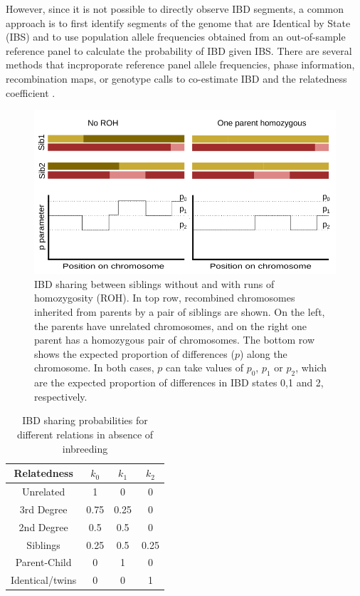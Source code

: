 \documentclass[12pt, letterpaper]{article}
\begin{document}
However, since it is not possible to directly observe IBD segments, a common approach is to first identify segments of the genome that are Identical by State (IBS) and to use population allele frequencies obtained from an out-of-sample reference panel to calculate the probability of IBD given IBS. There are several methods that incproporate reference panel allele frequencies, phase information, recombination maps, or genotype calls to co-estimate IBD and the relatedness coefficient \cite{huff_maximum-likelihood_2011,li_relationship_2014,li_accurate_2014,thornton_estimating_2012, boehnke_accurate_1997,lynch_estimation_1999, albrechtsen_natural_2010, purcell_plink_2007,manichaikul_robust_2010,gusev_whole_2009,nyerki_optimized_2022}.

\begin{figure}[h!]
    \includegraphics[width=18cm]{plots/inkscape_finalImg/schematic_sib.png}
    \centering
    \caption{IBD sharing between siblings without and with runs of homozygosity (ROH). In top row, recombined chromosomes inherited from parents by a pair of siblings are shown. On the left, the parents have unrelated chromosomes, and on the right one parent has a homozygous pair of chromosomes. The bottom row shows the expected proportion of differences ($p$) along the chromosome. In both cases, $p$ can take values of $p_0$, $p_1$ or $p_2$, which are the expected proportion of differences in IBD states 0,1 and 2, respectively.  }
    \label{fig0:schematic}
\end{figure}


\begin{table}[h!]
\caption{\label{tab:Table 1}IBD sharing probabilities for different relations in absence of inbreeding}
\begin{tabular}{|c|c|c|c|}
    \hline
    Relatedness & $k_0$ & $k_1$ & $k_2$\\
    \hline
    Unrelated & 1 & 0 & 0\\
    \hline
    3rd Degree & 0.75 & 0.25 & 0\\
    \hline
    2nd Degree & 0.5 & 0.5 & 0\\
    \hline
    Siblings & 0.25 & 0.5 & 0.25\\
    \hline
    Parent-Child & 0 & 1 & 0\\
    \hline
    Identical/twins & 0 & 0 & 1\\
    \hline
\end{tabular}
\label{table1}
\end{table}
\end{document}
